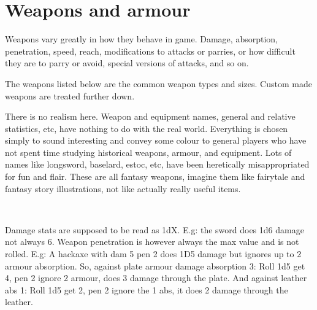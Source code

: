 






\section*{Weapons and armour}

Weapons vary greatly in how they behave in game. Damage, absorption, penetration, speed, reach, modifications to attacks or parries, or how difficult they are to parry or avoid, special versions of attacks, and so on.

The weapons listed below are the common weapon types and sizes. Custom made weapons are treated further down. 

There is no realism here. Weapon and equipment names, general and relative statistics, etc, have nothing to do with the real world. Everything is chosen simply to sound interesting and convey some colour to general players who have not spent time studying historical weapons, armour, and equipment. Lots of names like longsword, baselard, estoc, etc, have been heretically misappropriated for fun and flair. These are all fantasy weapons, imagine them like fairytale and fantasy story illustrations, not like actually really useful items.

\

Damage stats are supposed to be read as 1dX. E.g: the sword does 1d6 damage not always 6. Weapon penetration is however always the max value and is not rolled. E.g: A hackaxe with dam 5 pen 2 does 1D5 damage but ignores up to 2 armour absorption. So, against plate armour damage absorption 3: Roll 1d5 get 4, pen 2 ignore 2 armour, does 3 damage through the plate. And against leather abs 1: Roll 1d5 get 2, pen 2 ignore the 1 abs, it does 2 damage through the leather.


